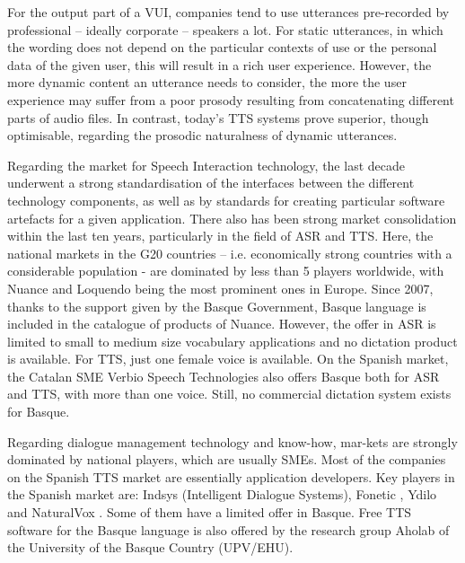 \begin{multicols}{2}

For the output part of a VUI, companies tend to use utterances pre-recorded by professional – ideally corporate – speakers a lot. For static utterances, in which the wording does not depend on the particular contexts of use or the personal data of the given user, this will result in a rich user experience. However, the more dynamic content an utterance needs to consider, the more the user experience may suffer from a poor prosody resulting from concatenating different parts of audio files. In contrast, today’s TTS systems prove superior, though optimisable, regarding the prosodic naturalness of dynamic utterances.  

Regarding the market for Speech Interaction technology, the last decade underwent a strong standardisation of the interfaces between the different technology components, as well as by standards for creating particular software artefacts for a given application. There also has been strong market consolidation within the last ten years, particularly in the field of ASR and TTS. Here, the national markets in the G20 countries – i.e. economically strong countries with a considerable population - are dominated by less than 5 players worldwide, with Nuance and Loquendo being the most prominent ones in Europe. Since 2007, thanks to the support given by the Basque Government, Basque language is included in the catalogue of products of Nuance. However, the offer in ASR is limited to small to medium size vocabulary applications and no dictation product is available. For TTS, just one female voice is available. On the Spanish market, the Catalan SME Verbio Speech Technologies \cite{BAS-Nota29}  also offers Basque both for ASR and TTS, with more than one voice.  Still, no commercial dictation system exists for Basque. 

Regarding dialogue management technology and know-how, mar-kets are strongly dominated by national players, which are usually SMEs. Most of the companies on the Spanish TTS market are essentially application developers. Key players in the Spanish market are: Indsys \cite{BAS-Nota30}  (Intelligent Dialogue Systems), Fonetic \cite{BAS-Nota31}, Ydilo \cite{BAS-Nota32}  and NaturalVox \cite{BAS-Nota33}. Some of them have a limited offer in Basque. Free TTS software for the Basque language is also offered by the research group Aholab \cite{BAS-Nota34} of the University of the Basque Country (UPV/EHU).


\end{multicols}
